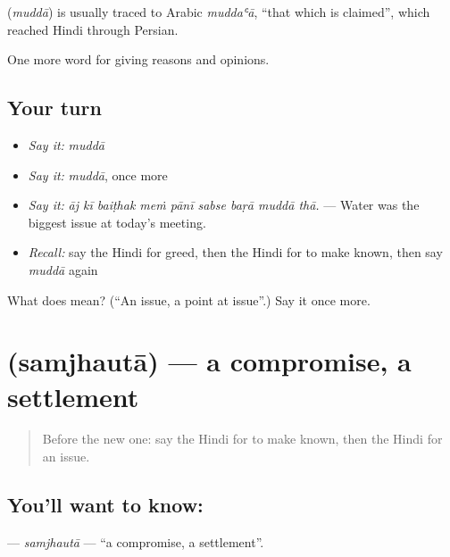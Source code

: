 \begin{cousinweb}
\textbf{} (\emph{muddā}) is usually traced to Arabic \emph{muddaʿā}, \textquotedblleft{}that which is claimed\textquotedblright{}, which reached Hindi through Persian.
\end{cousinweb}

\begin{grammarlens}[title={What you've built}]
One more word for giving reasons and opinions.
\end{grammarlens}

\subsection*{Your turn}
\begin{itemize}
\raggedright
  \item \emph{Say it:} \emph{muddā}
  \item \emph{Say it:} \emph{muddā}, once more
  \item \emph{Say it:} \emph{āj kī baiṭhak meṁ pānī sabse baṛā muddā thā.} — Water was the biggest issue at today's meeting.
  \item \emph{Recall:} say the Hindi for greed, then the Hindi for to make known, then say \emph{muddā} again
\end{itemize}

\begin{tcolorbox}[breakable,colback=teal!4,colframe=teal!35!black,title={Before you move on}]
What does  mean? (\textquotedblleft{}An issue, a point at issue\textquotedblright{}.) Say it once more.
\end{tcolorbox}
\section[\texorpdfstring{\hi{समझौता} (samjhautā)}{समझौता (samjhautā)}]{ (samjhautā) — a compromise, a settlement}

\label{lesson:HI-C359-samjhauta}



\begin{quote}
Before the new one: say the Hindi for to make known, then the Hindi for an issue.
\end{quote}

\subsection*{You'll want to know: }
\textbf{} — \emph{samjhautā} — \textquotedblleft{}a compromise, a settlement\textquotedblright{}.

